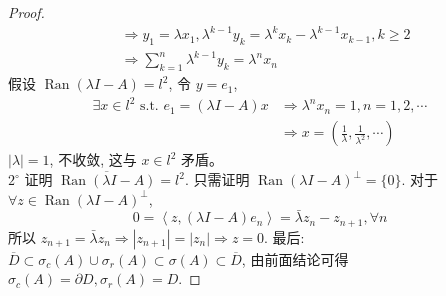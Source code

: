 \documentclass[lang=cn,newtx,10pt,scheme=chinese,thmcnt=chapter]{elegantbook}
\begin{document}
\begin{proof}
\begin{equation*}
\begin{aligned}
& \Rightarrow y_1=\lambda x_1, \lambda^{k-1} y_k=\lambda^k x_k-\lambda^{k-1} x_{k-1}, k \geqslant 2 \\
& \Rightarrow \sum_{k=1}^n \lambda^{k-1} y_k=\lambda^n x_n
\end{aligned}
\end{equation*}
假设 $\operatorname{Ran}(\lambda I-A)=l^2$, 令 $y=e_1$,
\begin{equation*}
\begin{aligned}
\exists x \in l^2 \text { s.t. } e_1=(\lambda I-A) x & \Rightarrow \lambda^n x_n=1, n=1,2, \cdots \\
& \Rightarrow x=\left(\frac{1}{\lambda}, \frac{1}{\lambda^2}, \cdots\right)
\end{aligned}
\end{equation*}
$|\lambda|=1$, 不收敛, 这与 $x \in l^2$ 矛盾。\\
$2^{\circ}$ 证明 $\overline{\operatorname{Ran}(\lambda I-A)}=l^2$. 只需证明 $\operatorname{Ran}(\lambda I-A)^{\perp}=\{0\}$. 对于 $\forall z \in \operatorname{Ran}(\lambda I-A)^{\perp}$,
\begin{equation*}
0=\left\langle z,(\lambda I-A) e_n\right\rangle=\bar{\lambda} z_n-z_{n+1}, \forall n
\end{equation*}
所以 $z_{n+1}=\bar{\lambda} z_n \Rightarrow\left|z_{n+1}\right|=\left|z_n\right| \Rightarrow z=0$.
最后: $\overline{ D } \subset \sigma_c(A) \cup \sigma_r(A) \subset \sigma(A) \subset \overline{ D }$, 由前面结论可得 $\sigma_c(A)=\partial D , \sigma_r(A)= D$.
\end{proof}
\end{document}
